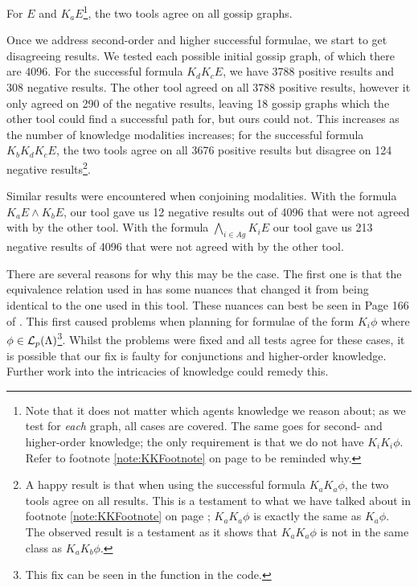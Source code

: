 \documentclass[10pt, a4paper]{report}
\begin{document}
For $E$ and $K_a E$\footnote{Note that it does not matter which agents knowledge
  we reason about; as we test for \emph{each} graph, all cases are covered. The
  same goes for second- and higher-order knowledge; the only requirement is that we do not
  have $K_i K_i \phi$. Refer to footnote \ref{note:KKFootnote} on page 
  \pageref{note:KKFootnote} to be reminded why.}, the two tools agree on all
gossip graphs.

Once we address second-order and higher successful formulae, we start to get
disagreeing results. We tested each possible initial gossip graph, of which
there are 4096. For the successful formula $K_d K_c E$, we have 3788 positive
results and 308 negative results. The other tool agreed on all 3788 positive
results, however it only agreed on 290 of the negative results, leaving 18
gossip graphs which the other tool could find a successful path for, but ours
could not. This increases as the number of knowledge modalities increases; for
the successful formula $K_b K_d K_c E$, the two tools agree on all 3676 positive
results but disagree on 124 negative results\footnote{A happy result is that
  when using the successful formula $K_a K_a \phi$, the two tools agree on all
  results. This is a testament to what we have talked about in footnote
  \ref{note:KKFootnote} on page \pageref{note:KKFootnote}; $K_a K_a \phi$ is
  exactly the same as $K_a \phi$. The observed result is a testament as it shows
that $K_a K_a \phi$ is not in the same class as $K_a K_b \phi$.}.

Similar results were encountered when conjoining modalities. With the formula
$K_a E \land K_b E$, our tool gave us 12 negative results out of 4096 that were
not agreed with by the other tool. With the formula $\bigwedge_{i \in Ag} K_i E$
our tool gave us 213 negative results of 4096 that were not agreed with by the
other tool.

There are several reasons for why this may be the case. The first one is that
the equivalence relation used in \cite{GithubGossip} has some nuances that
changed it from being identical to the one used in this tool. These nuances can
best be seen in Page 166 of \cite{SMCDEL}. This first caused problems when
planning for formulae of the form $K_i \phi$ where $\phi \in
\mathcal{L}_p(\Lambda)$\footnote{This fix can be seen in the 
  function in the code.}. Whilst the problems were fixed and all tests agree for
these cases, it is possible that our fix is faulty for conjunctions and
higher-order knowledge. Further work into the intricacies of knowledge could
remedy this.
\end{document}
